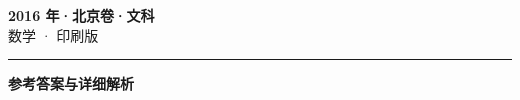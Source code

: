 \documentclass[zihao=5, a4paper]{ctexart}
\begin{document}
\begin{center}
  {\Large\bfseries 2016 年·北京卷·文科}\\[4pt]
  {\large 数学 · 印刷版}
\end{center}
\medskip
{}

\par\bigskip\hrule\bigskip
{}
\begin{center}{\large\bfseries 参考答案与详细解析}\end{center}
\smallskip

\end{document}
